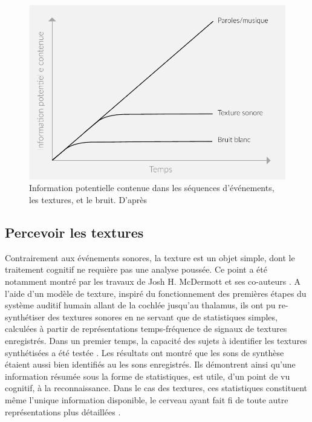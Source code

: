 \begin{figure}[bth]
        \myfloatalign
        \includegraphics[width=\linewidth]{gfx/texture}
        \caption[Information potentielle contenue dans les séquences d'événements, les textures, et le bruit]{Information potentielle contenue dans les séquences d'événements, les textures, et le bruit. D'après \citep{saint1995classification}}\label{fig:texture}
\end{figure}

\subsection{Percevoir les textures}

Contrairement aux événements sonores, la texture est un objet simple, dont le traitement cognitif ne requière pas une analyse poussée. Ce point a été notamment montré par les travaux de Josh H. McDermott et ses co-auteurs \citep{mcdermott2011sound,mcdermott2013summary}. A l'aide d'un modèle de texture, inspiré du fonctionnement des premières étapes du système auditif humain allant de la cochlée jusqu'au thalamus, ils ont pu re-synthétiser des textures sonores en ne servant que de statistiques simples, calculées à partir de représentations temps-fréquence de signaux de textures enregistrés. Dans un premier temps, la capacité des sujets à identifier les textures synthétisées a été testée \citep{mcdermott2011sound}. Les résultats ont montré que les sons de synthèse étaient aussi bien identifiés au les sons enregistrés. Ils démontrent ainsi qu'une information résumée sous la forme de statistiques, est utile, d'un point de vu cognitif, à la reconnaissance. Dans le cas des textures, ces statistiques constituent même l'unique information disponible, le cerveau ayant fait fi de toute autre représentations plus détaillées \citep{nelken2013ear}.

